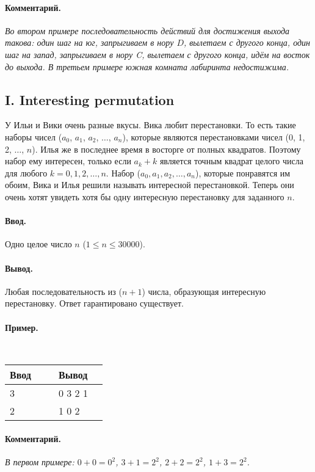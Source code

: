 \documentclass[12pt, a4paper]{article}
\newcommand{\informat}[1]
{
	\paragraph{Ввод.\\} #1
}
\newcommand{\outformat}[1]
{
	\paragraph{Вывод.\\} #1
}
\newcommand{\examplee}[4]
{
	\paragraph{Пример.\\}
	{\tt
	\begin{tabular}{|p{0.4\linewidth}|p{0.4\linewidth}|}
	\hline
	Ввод 	& Вывод  	\\
	\hline
	#1 		& #2 		\\
	\hline
	#3		& #4		\\
	\hline
	\end{tabular}
	}
}
\newcommand{\excomm}[1]
{
	\paragraph{Комментарий. \\}
	\textit{#1}
}
\begin{document}
\excomm{Во втором примере последовательность действий для достижения выхода такова: один шаг на юг, запрыгиваем в нору $D$, вылетаем с другого конца, один шаг на запад, запрыгиваем в нору C, вылетаем с другого конца, идём на восток до выхода. В третьем примере южная комната лабиринта недостижима.}



\subsection*{I. Interesting permutation}

У Ильи и Вики очень разные вкусы. Вика любит перестановки. То есть такие наборы чисел ($a_0$, $a_1$, $a_2$, $\dots$, $a_n$), которые являются перестановками чисел (0, 1, 2, $\dots$, $n$). Илья же в последнее время в восторге от полных квадратов. Поэтому набор ему интересен, только если $a_k+k$ является точным квадрат целого числа для любого $k = 0, 1, 2, \dots, n$. Набор ($a_0, a_1, a_2, \dots, a_n$), которые понравятся им обоим, Вика и Илья решили называть интересной перестановкой. Теперь они очень хотят увидеть хотя бы одну интересную перестановку для заданного $n$.

\informat{Одно целое число $n$ ($1 \le n \le 30000$).}

\outformat{Любая последовательность из ($n+1$) числа, образующая интересную перестановку. Ответ гарантировано существует.}

\examplee{3}{0 3 2 1}{2}{1 0 2}

\excomm{В первом примере: $0 + 0 = 0^2$, $3 + 1 = 2^2$, $2 + 2 = 2^2$, $1 + 3 = 2^2$.}
\end{document}
